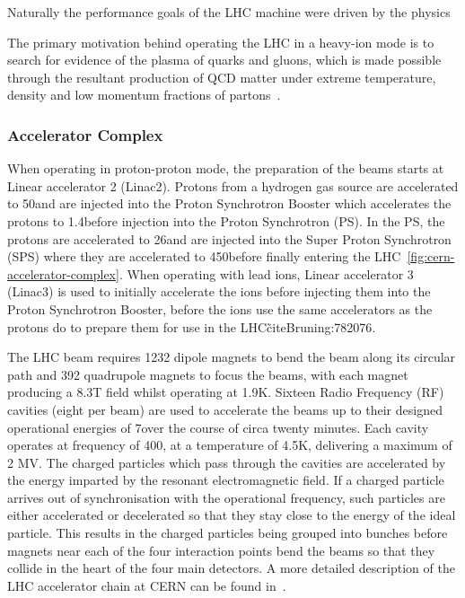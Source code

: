 Naturally the performance goals of the LHC machine were driven by the physics

The primary motivation behind operating the LHC in a heavy-ion mode is to search for evidence of the plasma of quarks and gluons, which is made possible through the resultant production of QCD matter under extreme temperature, density and low momentum fractions of partons~\cite{Baur:687318}.

\subsubsection{Accelerator Complex}
When operating in proton-proton mode, the preparation of the beams starts at Linear accelerator 2 (Linac2). 
Protons from a hydrogen gas source are accelerated to 50\MeV and are injected into the Proton Synchrotron Booster which accelerates the protons to 1.4\GeV before injection into the Proton Synchrotron (PS). 
In the PS, the protons are accelerated to 26\GeV and are injected into the Super Proton Synchrotron (SPS) where they are accelerated to 450\GeV before finally entering the LHC~\ref{fig:cern-accelerator-complex}. 
When operating with lead ions, Linear accelerator 3 (Linac3) is used to initially accelerate the ions before injecting them into the Proton Synchrotron Booster, before the ions use the same accelerators as the protons do to prepare them for use in the LHC\~cite{Bruning:782076}. 

The LHC beam requires 1232 dipole magnets to bend the beam along its circular path and 392 quadrupole magnets to focus the beams, with each magnet producing a 8.3T field whilst operating at 1.9K.
Sixteen Radio Frequency (RF) cavities (eight per beam) are used to accelerate the beams up to their designed operational energies of 7\TeV over the course of circa twenty minutes. 
Each cavity operates at frequency of 400\MHz, at a temperature of 4.5K, delivering a maximum of 2 MV. 
The charged particles which pass through the cavities are accelerated by the energy imparted by the resonant electromagnetic field. 
If a charged particle arrives out of synchronisation with the operational frequency, such particles are either accelerated or decelerated so that they stay close to the energy of the ideal particle. 
This results in the charged particles being grouped into bunches before magnets near each of the four interaction points bend the beams so that they collide in the heart of the four main detectors.
A more detailed description of the LHC accelerator chain at CERN can be found in~\cite{Schindl:397574}. 

